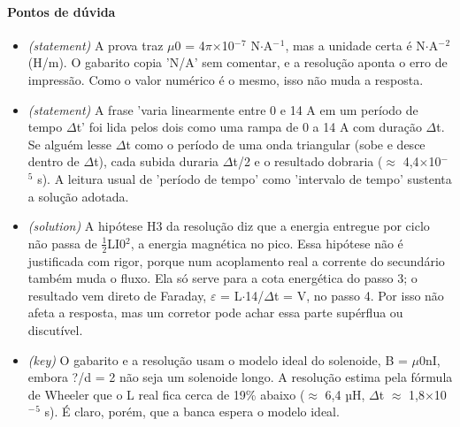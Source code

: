 \documentclass{article}%
\begin{document}
\paragraph{Pontos de dúvida}%
\begin{itemize}%
\item%
\textit{(statement)} A prova traz $\mu$0 = 4$\pi$$\times$10$^{-}$$^{7}$ N$\cdot$A$^{-}$$^{1}$, mas a unidade certa é N$\cdot$A$^{-}$$^2$ (H/m). O gabarito copia 'N/A' sem comentar, e a resolução aponta o erro de impressão. Como o valor numérico é o mesmo, isso não muda a resposta.%
\item%
\textit{(statement)} A frase 'varia linearmente entre 0 e 14 A em um período de tempo $\Delta$t' foi lida pelos dois como uma rampa de 0 a 14 A com duração $\Delta$t. Se alguém lesse $\Delta$t como o período de uma onda triangular (sobe e desce dentro de $\Delta$t), cada subida duraria $\Delta$t/2 e o resultado dobraria ($\approx$ 4,4$\times$10$^{-}$$^{5}$ s). A leitura usual de 'período de tempo' como 'intervalo de tempo' sustenta a solução adotada.%
\item%
\textit{(solution)} A hipótese H3 da resolução diz que a energia entregue por ciclo não passa de $\frac12$LI0$^2$, a energia magnética no pico. Essa hipótese não é justificada com rigor, porque num acoplamento real a corrente do secundário também muda o fluxo. Ela só serve para a cota energética do passo 3; o resultado vem direto de Faraday, $\varepsilon$ = L$\cdot$14/$\Delta$t = V, no passo 4. Por isso não afeta a resposta, mas um corretor pode achar essa parte supérflua ou discutível.%
\item%
\textit{(key)} O gabarito e a resolução usam o modelo ideal do solenoide, B = $\mu$0nI, embora ?/d = 2 não seja um solenoide longo. A resolução estima pela fórmula de Wheeler que o L real fica cerca de 19\% abaixo ($\approx$ 6,4 µH, $\Delta$t $\approx$ 1,8$\times$10$^{-}$$^{5}$ s). É claro, porém, que a banca espera o modelo ideal.%
\end{itemize}%
\end{document}
